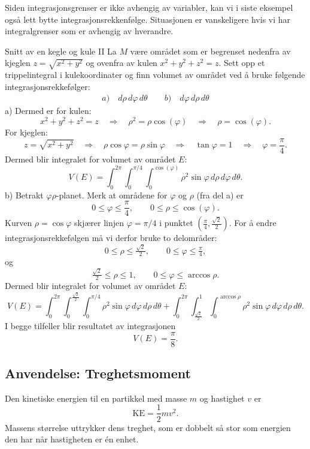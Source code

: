 Siden integrasjonsgrenser er ikke avhengig av variabler, kan vi i siste eksempel også lett bytte integrasjonsrekkenfølge. Situasjonen er vanskeligere hvis vi har integralgrenser som er avhengig av hverandre.

\begin{eks}{Snitt av en kegle og kule II}
La $M$ være området som er begrenset nedenfra av kjeglen 
$z = \sqrt{x^{2} + y^{2}}$
og ovenfra av kulen $x^{2} + y^{2} + z^{2} = z$. Sett opp et trippelintegral i kulekoordinater og finn volumet av området ved å bruke følgende integrasjonsrekkefølger:
\begin{align*}
a)\quad d\rho \, d\varphi \, d\theta \qquad b)\quad d\varphi \, d\rho \, d\theta
\end{align*}
a) Dermed er for kulen:
\[
x^{2} + y^{2} + z^{2} = z
\quad \Rightarrow \quad 
\rho^{2} = \rho \cos (\varphi) 
\quad \Rightarrow \quad 
\rho = \cos (\varphi).
\]
For kjeglen:
\[
z = \sqrt{x^{2} + y^{2}}
\quad \Rightarrow \quad 
\rho \cos \varphi = \rho \sin \varphi
\quad \Rightarrow \quad 
\tan \varphi = 1
\quad \Rightarrow \quad 
\varphi = \frac{\pi}{4}.
\]
Dermed blir integralet for volumet av området $E$:
\[
V(E) = \int_{0}^{2\pi} \int_{0}^{\pi/4} \int_{0}^{\cos (\varphi)} 
\rho^{2} \sin \varphi \, d\rho \, d\varphi \, d\theta.
\]
b) Betrakt $\varphi\rho$-planet. Merk at områdene for $\varphi$ og $\rho$ (fra del a) er
\[
0 \leq \varphi \leq \frac{\pi}{4}, 
\qquad 0 \leq \rho \leq \cos (\varphi).
\]
Kurven $\rho = \cos \varphi$ skjærer linjen $\varphi = \pi/4$ i punktet $\left(\tfrac{\pi}{4}, \tfrac{\sqrt{2}}{2}\right)$.
For å endre integrasjonsrekkefølgen må vi derfor bruke to delområder:
\[
0 \leq \rho \leq \tfrac{\sqrt{2}}{2}, 
\qquad 0 \leq \varphi \leq \tfrac{\pi}{4},
\]
og
\[
\tfrac{\sqrt{2}}{2} \leq \rho \leq 1, 
\qquad 0 \leq \varphi \leq \arccos \rho.
\]
Dermed blir integralet for volumet av området $E$:
\[
V(E) = \int_{0}^{2\pi} 
\int_{0}^{\tfrac{\sqrt{2}}{2}} 
\int_{0}^{\pi/4} 
\rho^{2} \sin \varphi \, d\varphi \, d\rho \, d\theta
+ \int_{0}^{2\pi} 
\int_{\tfrac{\sqrt{2}}{2}}^{1} 
\int_{0}^{\arccos \rho} 
\rho^{2} \sin \varphi \, d\varphi \, d\rho \, d\theta.
\]
I begge tilfeller blir resultatet av integrasjonen
\[
V(E) = \frac{\pi}{8}.
\]
\end{eks}

\subsection{Anvendelse: Treghetsmoment }
Den kinetiske energien til en partikkel med masse \( m \) og hastighet \( v \) er
\[
\text{KE} = \frac{1}{2}mv^2.
\]
Massens størrelse uttrykker dens treghet, som er dobbelt så stor som energien den har når hastigheten er én enhet.

